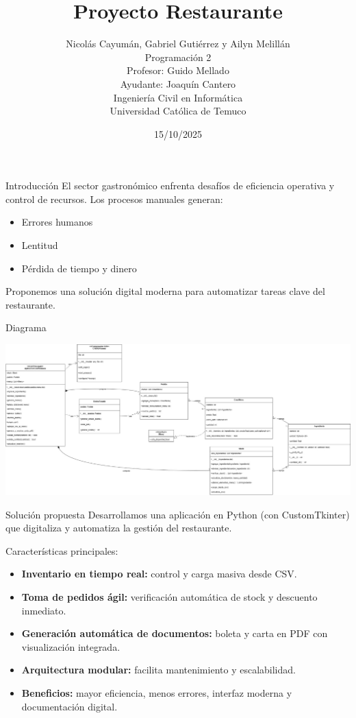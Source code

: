 \documentclass{beamer}
\title{Proyecto Restaurante}
\author{
Nicolás Cayumán, Gabriel Gutiérrez y Ailyn Melillán\\[4pt]
\small Programación 2\\
Profesor: Guido Mellado\\
Ayudante: Joaquín Cantero\\
Ingeniería Civil en Informática\\
Universidad Católica de Temuco
}
\date{15/10/2025}
\begin{document}
\begin{frame}
  \titlepage
\end{frame}

\begin{frame}{Introducción}
El sector gastronómico enfrenta desafíos de eficiencia operativa y control de recursos.
Los procesos manuales generan:
    \begin{itemize}
            \item Errores humanos
            \item Lentitud
            \item Pérdida de tiempo y dinero
    \end{itemize}
Proponemos una solución digital moderna para automatizar tareas clave del restaurante.
\end{frame}


\begin{frame}{Diagrama}
    \begin{center}
        \includegraphics[width=1\textwidth]{images/Diagramaproyecto.png}
    \end{center}
\end{frame}

\begin{frame}{Solución propuesta}
Desarrollamos una aplicación en Python (con CustomTkinter) que digitaliza y automatiza la gestión del restaurante.

Características principales:
\begin{itemize}
    
    \item \textbf{Inventario en tiempo real:} control y carga masiva desde CSV.
    \item \textbf{Toma de pedidos ágil:} verificación automática de stock y descuento inmediato.
    \item \textbf{Generación automática de documentos:} boleta y carta en PDF con visualización integrada.
    \item \textbf{Arquitectura modular:} facilita mantenimiento y escalabilidad.
    \item \textbf{Beneficios:} mayor eficiencia, menos errores, interfaz moderna y documentación digital.
\end{itemize}
\end{frame}
\end{document}
